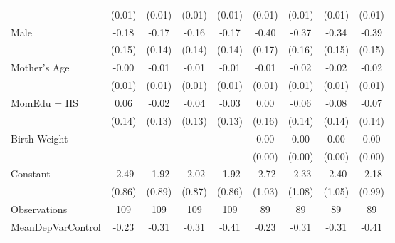 {\begin{tabular}{l*{8}{c}}
                    &      (0.01)         &      (0.01)         &      (0.01)         &      (0.01)         &      (0.01)         &      (0.01)         &      (0.01)         &      (0.01)         \\
[1em]
Male                &       -0.18         &       -0.17         &       -0.16         &       -0.17         &       -0.40\sym{**} &       -0.37\sym{**} &       -0.34\sym{**} &       -0.39\sym{**} \\
                    &      (0.15)         &      (0.14)         &      (0.14)         &      (0.14)         &      (0.17)         &      (0.16)         &      (0.15)         &      (0.15)         \\
[1em]
Mother's Age        &       -0.00         &       -0.01         &       -0.01         &       -0.01         &       -0.01         &       -0.02         &       -0.02         &       -0.02         \\
                    &      (0.01)         &      (0.01)         &      (0.01)         &      (0.01)         &      (0.01)         &      (0.01)         &      (0.01)         &      (0.01)         \\
[1em]
MomEdu = HS         &        0.06         &       -0.02         &       -0.04         &       -0.03         &        0.00         &       -0.06         &       -0.08         &       -0.07         \\
                    &      (0.14)         &      (0.13)         &      (0.13)         &      (0.13)         &      (0.16)         &      (0.14)         &      (0.14)         &      (0.14)         \\
[1em]
Birth Weight        &                     &                     &                     &                     &        0.00\sym{*}  &        0.00         &        0.00         &        0.00\sym{*}  \\
                    &                     &                     &                     &                     &      (0.00)         &      (0.00)         &      (0.00)         &      (0.00)         \\
[1em]
Constant            &       -2.49\sym{***}&       -1.92\sym{**} &       -2.02\sym{**} &       -1.92\sym{**} &       -2.72\sym{***}&       -2.33\sym{**} &       -2.40\sym{**} &       -2.18\sym{**} \\
                    &      (0.86)         &      (0.89)         &      (0.87)         &      (0.86)         &      (1.03)         &      (1.08)         &      (1.05)         &      (0.99)         \\
\hline
Observations        &         109         &         109         &         109         &         109         &          89         &          89         &          89         &          89         \\
MeanDepVarControl   &       -0.23         &       -0.31         &       -0.31         &       -0.41         &       -0.23         &       -0.31         &       -0.31         &       -0.41         \\
\hline\hline
\end{tabular}
}
